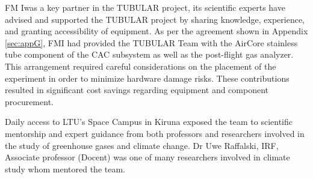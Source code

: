 FM Iwas a key partner in the TUBULAR project, its scientific experts have advised and supported the TUBULAR project by sharing knowledge, experience, and granting accessibility of equipment. As per the agreement shown in Appendix \ref{sec:appG}, FMI had provided the TUBULAR Team with the AirCore stainless tube component of the CAC subsystem as well as the post-flight gas analyzer. This arrangement required careful considerations on the placement of the experiment in order to minimize hardware damage risks. These contributions resulted in significant cost savings regarding equipment and component procurement.

Daily access to LTU's Space Campus in Kiruna exposed the team to scientific mentorship and expert guidance from both professors and researchers involved in the study of greenhouse gases and climate change. Dr Uwe Raffalski, IRF, Associate professor (Docent) was one of many researchers involved in climate study whom mentored the team.